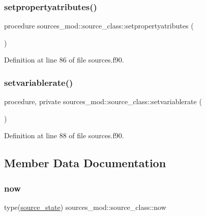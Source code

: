 \subsubsection{\texorpdfstring{setpropertyatributes()}{setpropertyatributes()}}
{\footnotesize\ttfamily procedure sources\+\_\+mod\+::source\+\_\+class\+::setpropertyatributes (\begin{DoxyParamCaption}{ }\end{DoxyParamCaption})\hspace{0.3cm}{\ttfamily [private]}}



Definition at line 86 of file sources.\+f90.

\mbox{\label{structsources__mod_1_1source__class_aa7fb066bddba81b55086c885232104d5}} 
\subsubsection{\texorpdfstring{setvariablerate()}{setvariablerate()}}
{\footnotesize\ttfamily procedure, private sources\+\_\+mod\+::source\+\_\+class\+::setvariablerate (\begin{DoxyParamCaption}{ }\end{DoxyParamCaption})\hspace{0.3cm}{\ttfamily [private]}}



Definition at line 88 of file sources.\+f90.



\subsection{Member Data Documentation}
\mbox{\label{structsources__mod_1_1source__class_aa79ef3a745f7e6e934acdda367e8995c}} 
\subsubsection{\texorpdfstring{now}{now}}
{\footnotesize\ttfamily type(\mbox{\hyperlink{structsources__mod_1_1source__state}{source\+\_\+state}}) sources\+\_\+mod\+::source\+\_\+class\+::now\hspace{0.3cm}{\ttfamily [private]}}



